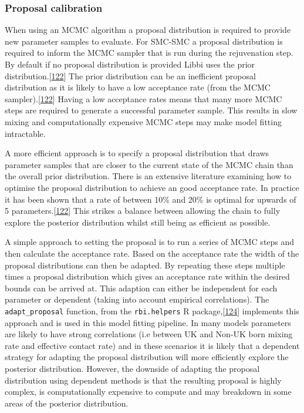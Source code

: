 \documentclass[11pt,twoside]{bristolthesis}
\begin{document}
  \hypertarget{proposal-calibration}{%
  \subsubsection{Proposal calibration}\label{proposal-calibration}}
  
  When using an MCMC algorithm a proposal distribution is required to provide new parameter samples to evaluate. For SMC-SMC a proposal distribution is required to inform the MCMC sampler that is run during the rejuvenation step. By default if no proposal distribution is provided Libbi uses the prior distribution.{[}\protect\hyperlink{ref-Murray2015}{122}{]} The prior distribution can be an inefficient proposal distribution as it is likely to have a low acceptance rate (from the MCMC sampler).{[}\protect\hyperlink{ref-Murray2015}{122}{]} Having a low acceptance rates means that many more MCMC steps are required to generate a successful parameter sample. This results in slow mixing and computationally expensive MCMC steps may make model fitting intractable.
  
  A more efficient approach is to specify a proposal distribution that draws parameter samples that are closer to the current state of the MCMC chain than the overall prior distribution. There is an extensive literature examining how to optimise the proposal distribution to achieve an good acceptance rate. In practice it has been shown that a rate of between 10\% and 20\% is optimal for upwards of 5 parameters.{[}\protect\hyperlink{ref-Murray2015}{122}{]} This strikes a balance between allowing the chain to fully explore the posterior distribution whilst still being as efficient as possible.
  
  A simple approach to setting the proposal is to run a series of MCMC steps and then calculate the acceptance rate. Based on the acceptance rate the width of the proposal distributions can then be adapted. By repeating these steps multiple times a proposal distribution which gives an acceptance rate within the desired bounds can be arrived at. This adaption can either be independent for each parameter or dependent (taking into account empirical correlations). The \texttt{adapt\_proposal} function, from the \texttt{rbi.helpers} R package,{[}\protect\hyperlink{ref-Funk:2019uw}{124}{]} implements this approach and is used in this model fitting pipeline. In many models parameters are likely to have strong correlations (i.e between UK and Non-UK born mixing rate and effective contact rate) and in these scenarios it is likely that a dependent strategy for adapting the proposal distribution will more efficiently explore the posterior distribution. However, the downside of adapting the proposal distribution using dependent methods is that the resulting proposal is highly complex, is computationally expensive to compute and may breakdown in some areas of the posterior distribution.
  
\end{document}
